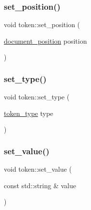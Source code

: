 \mbox{\label{classtoken_a39861264959b5276f7c8c6fbd6047bc6}} 
\subsubsection{\texorpdfstring{set\_position()}{set\_position()}}
{\footnotesize\ttfamily void token\+::set\+\_\+position (\begin{DoxyParamCaption}\item[{\mbox{\hyperlink{structdocument__position}{document\+\_\+position}}}]{position }\end{DoxyParamCaption})\hspace{0.3cm}{\ttfamily [inline]}}

\mbox{\label{classtoken_afd4182d22aed4f89e9f8e3cf93689c73}} 
\subsubsection{\texorpdfstring{set\_type()}{set\_type()}}
{\footnotesize\ttfamily void token\+::set\+\_\+type (\begin{DoxyParamCaption}\item[{\mbox{\hyperlink{token_8h_afe5ef662303b6b710ea6ee1a944bad0d}{token\+\_\+type}}}]{type }\end{DoxyParamCaption})\hspace{0.3cm}{\ttfamily [inline]}}

\mbox{\label{classtoken_ab814a9dc7135593a8be438fbce5c0209}} 
\subsubsection{\texorpdfstring{set\_value()}{set\_value()}}
{\footnotesize\ttfamily void token\+::set\+\_\+value (\begin{DoxyParamCaption}\item[{const std\+::string \&}]{value }\end{DoxyParamCaption})\hspace{0.3cm}{\ttfamily [inline]}}

\mbox{\label{classtoken_a29f1fc3b00eb1923f38cac235c93758a}} 
